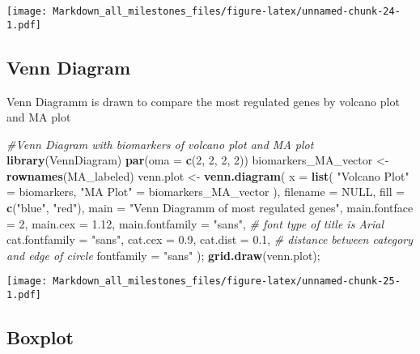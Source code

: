 \documentclass[]{article}
\newenvironment{Shaded}{\begin{snugshade}}{\end{snugshade}}
\newcommand{\CommentTok}[1]{\textcolor[rgb]{0.56,0.35,0.01}{\textit{#1}}}
\newcommand{\DataTypeTok}[1]{\textcolor[rgb]{0.13,0.29,0.53}{#1}}
\newcommand{\DecValTok}[1]{\textcolor[rgb]{0.00,0.00,0.81}{#1}}
\newcommand{\FloatTok}[1]{\textcolor[rgb]{0.00,0.00,0.81}{#1}}
\newcommand{\KeywordTok}[1]{\textcolor[rgb]{0.13,0.29,0.53}{\textbf{#1}}}
\newcommand{\NormalTok}[1]{#1}
\newcommand{\OtherTok}[1]{\textcolor[rgb]{0.56,0.35,0.01}{#1}}
\newcommand{\StringTok}[1]{\textcolor[rgb]{0.31,0.60,0.02}{#1}}
\begin{document}
\texttt{[image: Markdown\_all\_milestones\_files/figure-latex/unnamed-chunk-24-1.pdf]}

\hypertarget{venn-diagram}{%
\subsection{Venn Diagram}\label{venn-diagram}}

Venn Diagramm is drawn to compare the most regulated genes by volcano
plot and MA plot

\begin{Shaded}
\begin{Highlighting}[]
\CommentTok{#Venn Diagram with biomarkers of volcano plot and MA plot}
\KeywordTok{library}\NormalTok{(VennDiagram)}
\KeywordTok{par}\NormalTok{(}\DataTypeTok{oma =} \KeywordTok{c}\NormalTok{(}\DecValTok{2}\NormalTok{, }\DecValTok{2}\NormalTok{, }\DecValTok{2}\NormalTok{, }\DecValTok{2}\NormalTok{))}
\NormalTok{biomarkers_MA_vector <-}\StringTok{ }\KeywordTok{rownames}\NormalTok{(MA_labeled)}
\NormalTok{venn.plot <-}\StringTok{ }\KeywordTok{venn.diagram}\NormalTok{(}
  \DataTypeTok{x =} \KeywordTok{list}\NormalTok{(}
    \StringTok{"Volcano Plot"}\NormalTok{ =}\StringTok{ }\NormalTok{biomarkers,}
    \StringTok{"MA Plot"}\NormalTok{ =}\StringTok{ }\NormalTok{biomarkers_MA_vector}
\NormalTok{    ),}
  \DataTypeTok{filename =} \OtherTok{NULL}\NormalTok{, }
  \DataTypeTok{fill =} \KeywordTok{c}\NormalTok{(}\StringTok{"blue"}\NormalTok{, }\StringTok{"red"}\NormalTok{), }
  \DataTypeTok{main =} \StringTok{"Venn Diagramm of most regulated genes"}\NormalTok{, }
  \DataTypeTok{main.fontface =} \DecValTok{2}\NormalTok{,}
  \DataTypeTok{main.cex =} \FloatTok{1.12}\NormalTok{,}
  \DataTypeTok{main.fontfamily =} \StringTok{"sans"}\NormalTok{, }\CommentTok{# font type of title is Arial }
  \DataTypeTok{cat.fontfamily =} \StringTok{"sans"}\NormalTok{,}
  \DataTypeTok{cat.cex =} \FloatTok{0.9}\NormalTok{,}
  \DataTypeTok{cat.dist =} \FloatTok{0.1}\NormalTok{, }\CommentTok{# distance between category and edge of circle}
  \DataTypeTok{fontfamily =} \StringTok{"sans"}
\NormalTok{  );}
\KeywordTok{grid.draw}\NormalTok{(venn.plot);}
\end{Highlighting}
\end{Shaded}

\texttt{[image: Markdown\_all\_milestones\_files/figure-latex/unnamed-chunk-25-1.pdf]}

\hypertarget{boxplot-1}{%
\subsection{Boxplot}\label{boxplot-1}}
\end{document}

